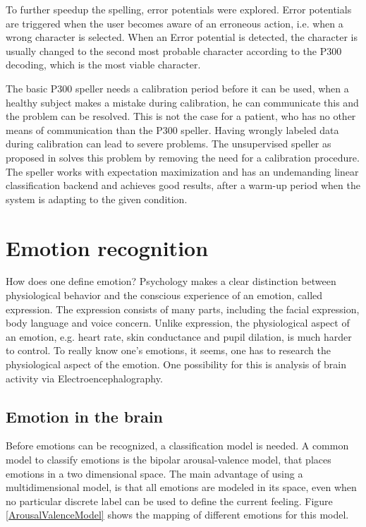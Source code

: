 To further speedup the spelling, error potentials were explored. Error potentials are triggered when the user becomes aware of an erroneous action\cite{ErrorPotentials}, i.e. when a wrong character is selected. When an Error potential is detected, the character is usually changed to the second most probable character according to the P300 decoding\cite{ErrSecChar}, which is the most viable character.

The basic P300 speller needs a calibration period before it can be used, when a healthy subject makes a mistake during calibration, he can communicate this and the problem can be resolved. This is not the case for a patient, who has no other means of communication than the P300 speller. Having wrongly labeled data during calibration can lead to severe problems. The unsupervised speller as proposed in \cite{P300Unsupervised} solves this problem by removing the need for a calibration procedure. The speller works with expectation maximization and has an undemanding linear classification backend and achieves good results, after a warm-up period when the system is adapting to the given condition.

\section{Emotion recognition}

How does one define emotion? Psychology makes a clear distinction between physiological behavior and the conscious experience of an emotion, called expression\cite{ExtendedPaper}. The expression consists of many parts, including the facial expression, body language and voice concern. Unlike expression, the physiological aspect of an emotion, e.g. heart rate, skin conductance and pupil dilation, is much harder to control. To really know one's emotions, it seems, one has to research the physiological aspect of the emotion. One possibility for this is analysis of brain activity via Electroencephalography\cite{EEGDatasets}.


\subsection{Emotion in the brain}

Before emotions can be recognized, a classification model is needed. A common model to classify emotions is the bipolar arousal-valence model\cite{ExtendedPaper,RealTimeEEGEmotion}, that places emotions in a two dimensional space. The main advantage of using a multidimensional model, is that all emotions are modeled in its space, even when no particular discrete label can be used to define the current feeling. Figure \ref{ArousalValenceModel} shows the mapping of different emotions for this model. 

